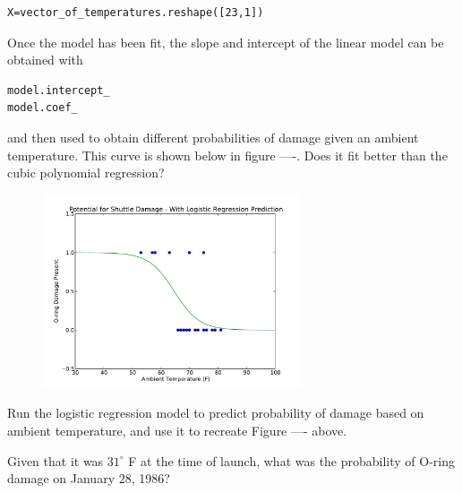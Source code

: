\begin{verbatim}
X=vector_of_temperatures.reshape([23,1])
\end{verbatim}

Once the model has been fit, the slope and intercept of the linear model can be obtained with
\begin{verbatim}
model.intercept_
model.coef_
\end{verbatim} 
and then used to obtain different probabilities of damage given an ambient temperature. This curve is shown below in figure ----. Does it fit better than the cubic polynomial regression?  

\begin{figure}[h]
\label{logisticmodel}
\centering
\includegraphics[width=3in]{logreg.pdf}
\end{figure}


\begin{problem}
Run the logistic regression model to predict probability of damage based on ambient temperature, and use it to recreate Figure ---- above. 
\end{problem}

\begin{problem}
Given that it was $31^{\circ}$ F at the time of launch, what was the probability of O-ring damage on January 28, 1986?
\end{problem}
